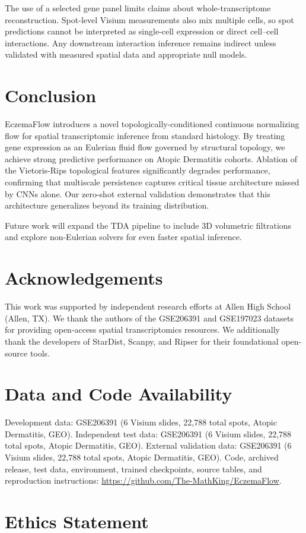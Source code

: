 \documentclass[nocrop]{bioinfo}
\newcommand{\datasetrequired}{GSE206391 (6 Visium slides, 22,788 total spots, Atopic Dermatitis, GEO)}
\newcommand{\coderequired}{\url{https://github.com/The-MathKing/EczemaFlow}}
\begin{document}
The use of a selected gene panel limits claims about whole-transcriptome
reconstruction. Spot-level Visium measurements also mix multiple cells, so
spot predictions cannot be interpreted as single-cell expression or direct
cell--cell interactions. Any downstream interaction inference remains
indirect unless validated with measured spatial data and appropriate null
models.

\section{Conclusion}

EczemaFlow introduces a novel topologically-conditioned continuous normalizing flow for spatial transcriptomic inference from standard histology. By treating gene expression as an Eulerian fluid flow governed by structural topology, we achieve strong predictive performance on Atopic Dermatitis cohorts. Ablation of the Vietoris-Rips topological features significantly degrades performance, confirming that multiscale persistence captures critical tissue architecture missed by CNNs alone. Our zero-shot external validation demonstrates that this architecture generalizes beyond its training distribution. 

Future work will expand the TDA pipeline to include 3D volumetric filtrations and explore non-Eulerian solvers for even faster spatial inference.

\section{Acknowledgements}

This work was supported by independent research efforts at Allen High School (Allen, TX). We thank the authors of the GSE206391 and GSE197023 datasets for providing open-access spatial transcriptomics resources. We additionally thank the developers of StarDist, Scanpy, and Ripser for their foundational open-source tools.

\section*{Data and Code Availability}

Development data: \datasetrequired. Independent test data:
\datasetrequired. External validation data: \datasetrequired. Code, archived
release, test data, environment, trained checkpoints, source tables, and
reproduction instructions: \coderequired.

\section*{Ethics Statement}
\end{document}
